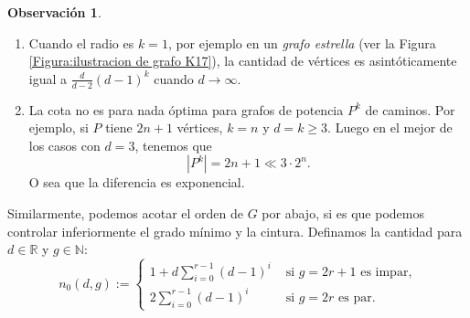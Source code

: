 \documentclass[12pt]{report}
\theoremstyle{plain}
\theoremstyle{definition}
\newtheorem{obs}[theorem]{Observación}
\newcommand{\naturals}{\mathbb{N}}
\newcommand{\reals}{\mathbb{R}}
\newcommand{\abs}[1]{\left \vert #1 \right \vert}
\begin{document}
\begin{obs}
\begin{enumerate}[(1)]
\item Cuando el radio es $k=1$, por ejemplo en un \textit{grafo estrella} (ver la Figura \ref{Figura:ilustracion de grafo K17}), la cantidad de vértices es asintóticamente igual a $\frac{d}{d-2} (d-1)^k$ cuando $d \rightarrow \infty$.

\item La cota no es para nada óptima para grafos de potencia $P^k$ de caminos. Por ejemplo, si $P$ tiene $2n+1$ vértices, $k = n$ y $d = k \geq 3$. Luego en el mejor de los casos con $d = 3$, tenemos que
$$
\abs{P^k} = 2n+1 \ll 3 \cdot 2^n .
$$
O sea que la diferencia es exponencial.

\end{enumerate}
\end{obs}

Similarmente, podemos acotar el orden de $G$ por abajo, si es que podemos controlar inferiormente el grado mínimo y la cintura. Definamos la cantidad para $d \in \reals$ y $g \in \naturals$:
\[
n_0(d,g):= \begin{cases}
            1 + d \sum_{i = 0}^{r-1} (d-1)^i & \text{ si $g = 2 r +1$ es impar,}\\
            2 \sum_{i=0}^{r-1} (d-1)^i & \text{ si $g = 2 r$ es par.}
            \end{cases}
\]
\end{document}
